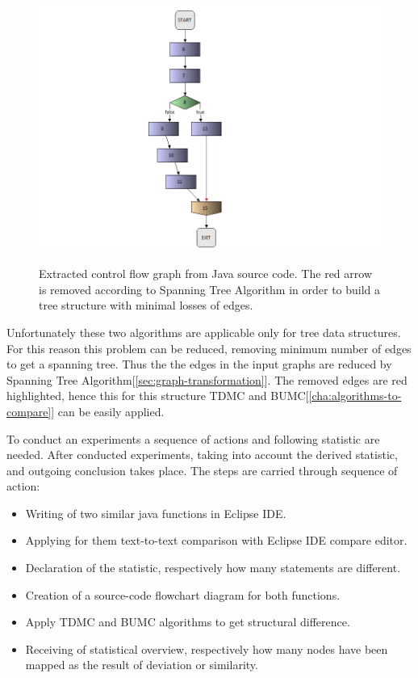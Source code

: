 \documentclass{report}
\begin{document}
\begin{figure}[h]
  \centering
  \includegraphics[scale = 0.5]{Figures/Java-flowchart-exp/control-flow-graph.png}\\[0.1cm]
  \caption[Extracted control flow graph from java source code]{Extracted control flow graph from Java source code. The red arrow is removed according to Spanning Tree Algorithm in order to build a tree structure with minimal losses of edges. }
  \label{fig:control-flow-graph}
\end{figure}

Unfortunately these two algorithms are applicable only for tree data structures. For this reason this problem can be reduced, removing minimum number of edges to get a spanning tree. Thus the the edges in the input graphs are reduced by Spanning Tree Algorithm[\ref{sec:graph-transformation}]. The removed edges are red highlighted, hence this for this structure TDMC and BUMC[\ref{cha:algorithms-to-compare}] can be easily applied.

To conduct an experiments a sequence of actions and following statistic are needed. After conducted experiments, taking into account the derived statistic, and outgoing conclusion takes place. The steps are carried through sequence of action:
\begin{itemize}
	\item Writing of two similar java functions in Eclipse IDE.
	\item Applying for them text-to-text comparison with Eclipse IDE compare editor.
	\item Declaration of the statistic, respectively how many statements are different.
	\item Creation of a source-code flowchart diagram for both functions.
	\item Apply TDMC and BUMC algorithms to get structural difference.
	\item Receiving of statistical overview, respectively how many nodes have been  mapped as the result of deviation or similarity.
\end{itemize}
\end{document}
